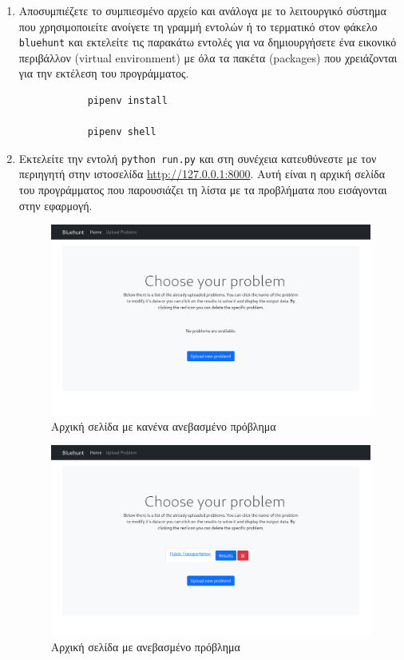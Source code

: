 \documentclass[11pt,a4paper,titlepage]{article}
\numberwithin{equation}{section}
\begin{document}
\begin{enumerate}
	\item Αποσυμπιέζετε το συμπιεσμένο αρχείο και ανάλογα με το λειτουργικό σύστημα που χρησιμοποιείτε ανοίγετε τη γραμμή εντολών ή το τερματικό στον φάκελο \texttt{bluehunt} και εκτελείτε τις παρακάτω εντολές για να δημιουργήσετε ένα εικονικό περιβάλλον (virtual environment) με όλα τα πακέτα (packages) που χρειάζονται για την εκτέλεση του προγράμματος.
	
	\begin{verbatim}
			pipenv install
			
			pipenv shell
	\end{verbatim}
	
	\item Εκτελείτε την εντολή \texttt{python run.py} και στη συνέχεια κατευθύνεστε με τον περιηγητή στην ιστοσελίδα \url{http://127.0.0.1:8000}. Αυτή είναι η αρχική σελίδα του προγράμματος που παρουσιάζει τη λίστα με τα προβλήματα που εισάγονται στην εφαρμογή.
	
	\begin{figure}[H]
		\centering
		\includegraphics[width=0.8\linewidth]{media/index_no_prob.png}
		\caption{Αρχική σελίδα με κανένα ανεβασμένο πρόβλημα}
		\label{fig:index_no_prob}
	\end{figure}
	
	\begin{figure}[H]
		\centering
		\includegraphics[width=0.8\linewidth]{media/index_with_prob.png}
		\caption{Αρχική σελίδα με ανεβασμένο πρόβλημα}
		\label{fig:index_with_prob}
	\end{figure}
	

\end{enumerate}
\end{document}
